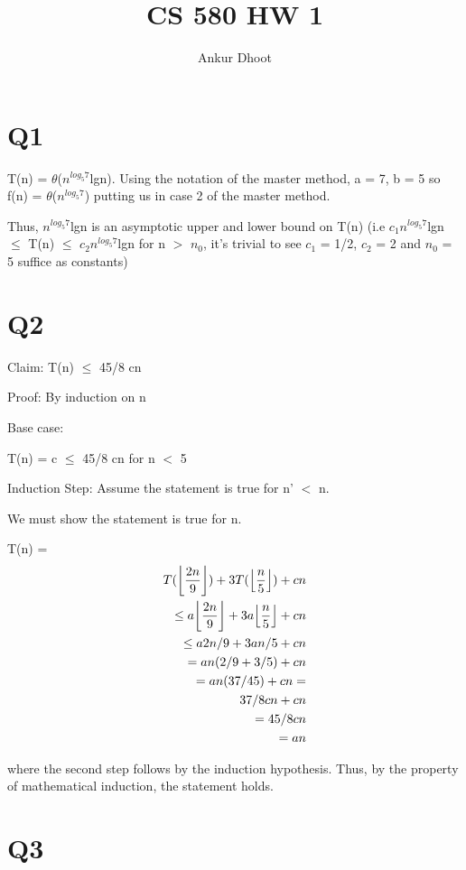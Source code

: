 \documentclass[11pt,a4paper]{article}
\DeclarePairedDelimiter\floor{\lfloor}{\rfloor}
\begin{document}
\author{Ankur Dhoot}
\title{CS 580 HW 1}
\maketitle

\section*{Q1}

T(n) = $\theta$($n^{log_5 7}$lgn). Using the notation of the master method, a = 7, b = 5 so f(n) = $\theta$($n^{log_5 7}$) putting us in case 2 of the master method. 

Thus, $n^{log_5 7}$lgn is an asymptotic upper and lower bound on T(n) (i.e $c_{1}$$n^{log_5 7}$lgn $\leq$ T(n) $\leq$ $c_{2}$$n^{log_5 7}$lgn for n $>$ $n_{0}$, it's trivial to see $c_{1}$ = 1/2, $c_{2}$ = 2 and $n_{0}$ = 5 suffice as constants)

\section*{Q2}
Claim: T(n) $\leq$ 45/8 cn

Proof: By induction on n

Base case: 

T(n) = c $\leq$ 45/8 cn for n $<$ 5

Induction Step: Assume the statement is true for n' $<$ n.

We must show the statement is true for n. 

T(n) = 
\begin{equation}
	\begin{aligned}
    T(\floor*{\frac{2n}{9}}) + 3T(\floor*{\frac{n}{5}}) + cn \\ 
    \leq a\floor*{\frac{2n}{9}} + 3a\floor*{\frac{n}{5}} + cn \\
    \leq a2n/9 + 3an/5 + cn \\
    = an(2/9 + 3/5) + cn \\
    = an(37/45) + cn = \\
    37/8cn + cn \\
    = 45/8cn \\
    = an
	\end{aligned}
\end{equation}

where the second step follows by the induction hypothesis. Thus, by the property of mathematical induction, the statement holds.

\section*{Q3}
\end{document}
